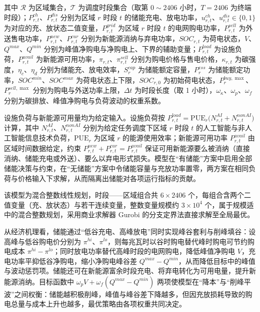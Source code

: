 \documentclass{ctexart}
\begin{document}
其中 $\mathcal{R}$ 为区域集合，$\mathcal{T}$ 为调度时段集合（取第 $0\sim2406$ 小时，$T=2406$ 为终端时段）；$P^{ch}_{r,t}$、$P^{dis}_{r,t}$ 分别为区域 $r$ 时段 $t$ 的储能充电、放电功率，$u^{ch}_{r,t}$、$u^{dis}_{r,t}\in\{0,1\}$ 为对应的充、放状态二值变量，$P^{grid}_{r,t}$ 为区域 $r$ 时段 $t$ 的电网购电功率，$P^{sell}_{r,t}$ 为外送售电功率，$P^{new}_{r,t}$、$P^{cur}_{r,t}$ 分别为新能源消纳与弃电功率，$SOC_{r,t}$ 为荷电状态，$V$、$Q^{max}$、$Q^{min}$ 分别为峰值净购电与净购电上、下界的辅助变量；$P^{load}_{r,t}$ 为设施负荷，$P^{avail}_{r,t}$ 为新能源可用功率，$\pi_{r,t}$、$\pi^{sell}_{r,t}$ 分别为购电价格与售电价格，$\kappa_{r,t}$ 为碳强度，$\eta_c$、$\eta_d$ 分别为储能充、放电效率，$S^{cap}_r$ 为储能额定容量，$P^{ess}_r$ 为储能额定功率，$SOC^{min}$、$SOC^{max}$ 为荷电状态上下限，$SOC_{r,0}$ 为初始荷电状态，$P^{buy,\max}_r$、$P^{sell,\max}_r$ 分别为购电与外送功率上限，$\Delta t$ 为时段长度（取 1 小时），$\omega_{\kappa}$、$\omega_p$、$\omega_f$ 分别为碳排放、峰值净购电与负荷波动的权重系数。

设施负荷与新能源可用量均为给定输入。设施负荷按 $P^{load}_{r,t}=\mathrm{PUE}_r\big(N^{AI}_{r,t}+N^{nonAI}_{r,t}\big)$ 计算，其中 $N^{AI}_{r,t}$、$N^{nonAI}_{r,t}$ 分别为给定任务调度下区域 $r$ 时段 $t$ 的人工智能与非人工智能信息技术负荷，$\mathrm{PUE}_r$ 为区域 $r$ 的能源使用效率；新能源可用功率 $P^{avail}_{r,t}$ 由区域时间数据给定，约束 $P^{new}_{r,t}+P^{cur}_{r,t}=P^{avail}_{r,t}$ 保证可用新能源要么被消纳（直接消纳、储能充电或外送）、要么以弃电形式损失。模型在“有储能”方案中启用全部储能决策与约束，在“无储能”方案中令储能容量与充放功率置零，两方案在相同负荷与价格输入下求解，从而隔离出储能对各项运行指标的贡献。

该模型为混合整数线性规划，时段——区域组合共 $6\times2406$ 个，每组合含两个二值变量（充、放状态）与若干连续变量，整数变量规模约 $3\times10^4$ 个，属于规模适中的混合整数规划，采用商业求解器 Gurobi 的分支定界法直接求解至全局最优。

从经济机理看，储能通过“低谷充电、高峰放电”同时实现峰谷套利与削峰填谷：设高峰与低谷购电价分别为 $\pi^{hi}$、$\pi^{lo}$，则每兆瓦时以谷时购电替代峰时购电可节约购电成本 $\pi^{hi}-\pi^{lo}$；同时放电功率替代高峰时段的电网购电，降低峰值净购电 $V$，充电功率平抑低谷净购电，缩小净购电峰谷差 $Q^{max}-Q^{min}$，从而降低目标中的峰值与波动惩罚项。储能还可在新能源富余时段充电、将弃电转化为可用电量，提升新能源消纳。目标函数中 $\omega_p V+\omega_f(Q^{max}-Q^{min})$ 两项使模型在“降本”与“削峰平波”之间权衡：储能越积极削峰，峰值与峰谷差下降越多，但因充放损耗导致的购电总量与成本上升也越多，最优策略由各项权重共同决定。
\end{document}
